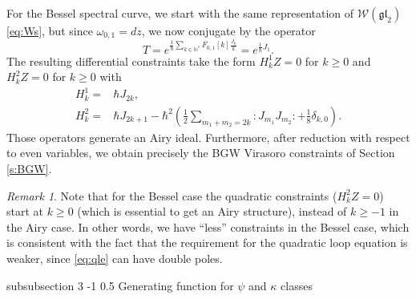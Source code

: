 \documentclass[reqno,oneside,11pt]{amsart}
\makeatletter
\theoremstyle{plain}
\theoremstyle{definition}
\theoremstyle{remark}
\newtheorem{remark}[theorem]{Remark}
\numberwithin{equation}{section}
\renewcommand{\subsubsection}{\@startsection
{subsubsection}%
{3}%
{\z@}%
{-1\baselineskip}%
{0.5\baselineskip}%
{\normalfont \it \normalsize}} %
\makeatother
\begin{document}
For the Bessel spectral curve, we start with the same representation of $\mathcal{W}(\mathfrak{gl}_2)$ \eqref{eq:Ws}, but since $\omega_{0,1} = dz$, we now conjugate by the operator
\begin{equation}
T = e^{\frac{1}{\hbar} \sum_{k \in \mathbb{N}^*} F_{0,1}[k] \frac{J_k}{k}}= e^{\frac{1}{\hbar} J_1 }.
\end{equation}
The resulting differential constraints take the form $H^1_k Z = 0$ for $k \geq 0$ and $H^2_k Z = 0$ for $k \geq 0$ with 
\begin{align}
H^1_k =&\hbar J_{2k},\\
H^2_k =&  \hbar J_{2k+1}- \hbar^2 \left( \frac{1}{2}\sum_{m_1+m_2 =2 k} : J_{m_1} J_{m_2}: + \frac{1}{8}\delta_{k,0} \right).
\end{align}
Those operators generate an Airy ideal. Furthermore, after reduction with respect to even variables, we obtain precisely the BGW Virasoro constraints of Section \ref{s:BGW}.

\begin{remark}
Note that for the Bessel case the quadratic constraints ($H^2_k Z = 0$) start at $k \geq 0$ (which is essential to get an Airy structure), instead of $k \geq -1$ in the Airy case. In other words, we have ``less'' constraints in the Bessel case, which is consistent with the fact that the requirement for the quadratic loop equation is weaker, since \eqref{eq:qle} can have double poles.
\end{remark}

\subsubsection{Generating function for $\psi$ and $\kappa$ classes}
\end{document}
